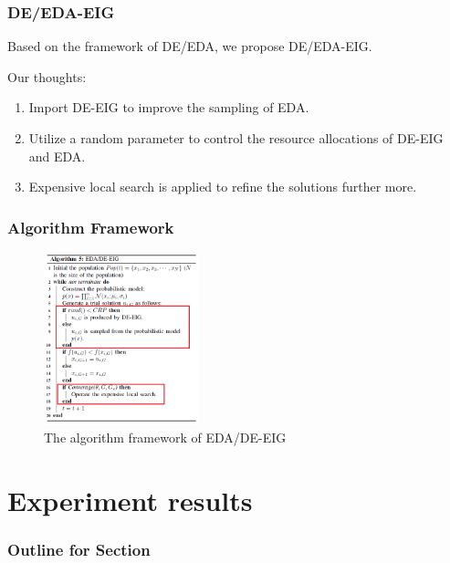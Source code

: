 \documentclass[xcolor=dvipsnames]{beamer}
\begin{document}
    \begin{frame}
    \frametitle{DE/EDA-EIG}
    Based on the framework of DE/EDA, we propose DE/EDA-EIG.
    
    Our thoughts:
    \begin{enumerate}
    \item Import DE-EIG to improve the sampling of EDA.
    \item Utilize a random parameter to control the resource allocations of DE-EIG and EDA.
    \item Expensive local search is applied to refine the solutions further more.
    \end{enumerate}

    \end{frame}
    
    \begin{frame}
    \frametitle{Algorithm Framework}
    \begin{figure}[H]
    \graphicspath{{figs/}}
    \includegraphics[width=0.4\textwidth]{deeda-eig.png}
    \caption{The algorithm framework of EDA/DE-EIG}
    \end{figure}
    \end{frame}



    \section{Experiment results}
    \begin{frame}
      \frametitle{Outline for Section \thesection}
      \tableofcontents[currentsection]
    \end{frame}
\end{document}
